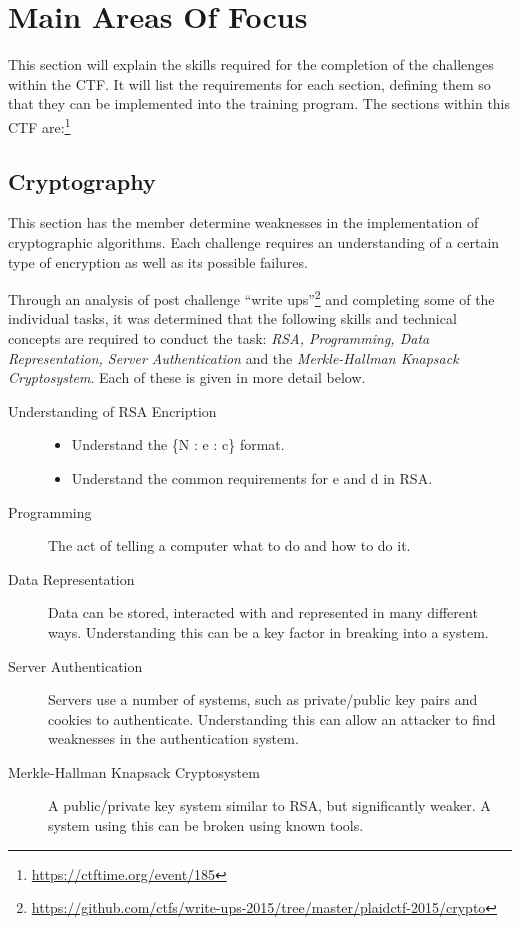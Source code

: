 \documentclass[twoside,a4paper,11pt]{report}
\begin{document}
	\section{Main Areas Of Focus}
		This section will explain the skills required for the completion of the challenges within the CTF. 
		It will list the requirements for each section, defining them so that they can be implemented into the training program. 
		The sections within this CTF are:\footnote{\url{https://ctftime.org/event/185}}
		\subsection{Cryptography}
			This section has the member determine weaknesses in the implementation of cryptographic algorithms. 
			Each challenge requires an understanding of a certain type of encryption as well as its possible failures. 


			Through an analysis of post challenge ``write ups''\footnote{\url{https://github.com/ctfs/write-ups-2015/tree/master/plaidctf-2015/crypto}}
			and completing some of the individual tasks, 
			it was determined that the following skills and technical concepts are required to conduct the task: 
			\textit{RSA, Programming, Data Representation, Server Authentication} and the \textit{Merkle-Hallman Knapsack Cryptosystem}. 
			Each of these is given in more detail below. 
			\begin{description}
				\item[Understanding of RSA Encription]
				\begin{itemize}
					\item Understand the \{N : e : c\} format. 
					\item Understand the common requirements for e and d in RSA. 
				\end{itemize}
				\item[Programming] 
					The act of telling a computer what to do and how to do it. 
				\item[Data Representation] 
					Data can be stored, interacted with and represented in many different ways. 
					Understanding this can be a key factor in breaking into a system. 
				\item[Server Authentication]
					Servers use a number of systems, such as private/public key pairs and cookies to authenticate. 
					Understanding this can allow an attacker to find weaknesses in the authentication system. 
				\item[Merkle-Hallman Knapsack Cryptosystem]
					A public/private key system similar to RSA, but significantly weaker. 
					A system using this can be broken using known tools. 
			\end{description}
\end{document}
